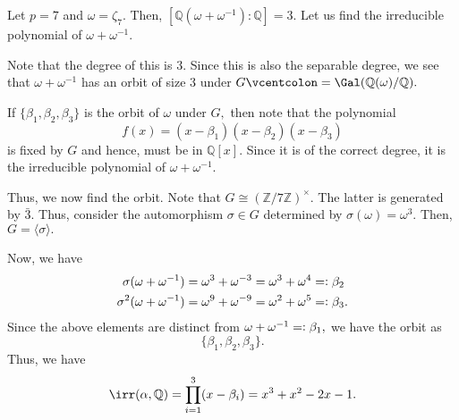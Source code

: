 \begin{ex}
    Let $p = 7$ and $\omega = \zeta_7.$ Then, $[\mathbb{Q}(\omega + \omega^{-1}) : \mathbb{Q}] = 3.$ Let us find the irreducible polynomial of $\omega + \omega^{-1}.$

    Note that the degree of this is $3.$ Since this is also the separable degree, we see that $\omega + \omega^{-1}$ has an orbit of size $3$ under $G \vcentcolon= \Gal(\mathbb{Q}(\omega)/\mathbb{Q}).$

    If $\{\beta_1, \beta_2, \beta_3\}$ is the orbit of $\omega$ under $G,$ then note that the polynomial
    \begin{equation*} 
        f(x) = (x - \beta_1) (x - \beta_2) (x - \beta_3)
    \end{equation*}
    is fixed by $G$ and hence, must be in $\mathbb{Q}[x].$ Since it is of the correct degree, it is the irreducible polynomial of $\omega + \omega^{-1}.$

    Thus, we now find the orbit. Note that $G \cong (\mathbb{Z}/7\mathbb{Z})^\times.$ The latter is generated by $\bar{3}.$ Thus, consider the automorphism $\sigma \in G$ determined by $\sigma(\omega) = \omega^3.$ Then, $G = \langle \sigma\rangle.$

    Now, we have
    \begin{align*} 
        \sigma(\omega + \omega^{-1}) &= \omega^3 + \omega^{-3} = \omega^3 + \omega^4 =\vcentcolon \beta_2\\
        \sigma^2(\omega + \omega^{-1}) &= \omega^9 + \omega^{-9} = \omega^2 + \omega^5 =\vcentcolon \beta_3.
    \end{align*}
    Since the above elements are distinct from $\omega + \omega^{-1} =\vcentcolon \beta_1,$ we have the orbit as
    \begin{equation*} 
        \{\beta_1, \beta_2, \beta_3\}.
    \end{equation*}
    Thus, we have
    \begin{equation*} 
        \irr(\alpha, \mathbb{Q}) = \prod_{i = 1}^{3}(x - \beta_i) = x^3 + x^2 - 2x - 1.
    \end{equation*}
\end{ex}